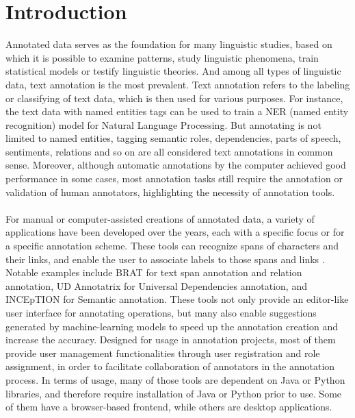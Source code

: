 \documentclass[12ptm a4paper]{article}
\begin{document}
\section{Introduction}
Annotated data serves as the foundation for many linguistic studies, based on which it is possible to examine patterns, study linguistic phenomena, train statistical models or testify linguistic theories. And among all types of linguistic data, text annotation is the most prevalent. Text annotation refers to the labeling or classifying of text data, which is then used for various purposes. For instance, the text data with named entities tags can be used to train a NER (named entity recognition) model for Natural Language Processing. But annotating is not limited to named entities, tagging semantic roles, dependencies, parts of speech, sentiments, relations and so on are all considered text annotations in common sense. Moreover, although automatic annotations by the computer achieved good performance in some cases, most annotation tasks still require the annotation or validation of human annotators, highlighting the necessity of annotation tools.\\
\\
For manual or computer-assisted creations of annotated data, a variety of applications have been developed over the years, each with a specific focus or for a specific annotation scheme. These tools can recognize spans of characters and their links, and enable the user to associate labels to those spans and links \citep{inbook}. Notable examples include BRAT for text span annotation and relation annotation, UD Annotatrix for Universal Dependencies annotation, and INCEpTION for Semantic annotation. These tools not only provide an editor-like user interface for annotating operations, but many also enable suggestions generated by machine-learning models to speed up the annotation creation and increase the accuracy. Designed for usage in annotation projects, most of them provide user management functionalities through user registration and role assignment, in order to facilitate collaboration of annotators in the annotation process. In terms of usage, many of those tools are dependent on Java or Python libraries, and therefore require installation of Java or Python prior to use. Some of them have a browser-based frontend, while others are desktop applications.\\
\\
\end{document}
